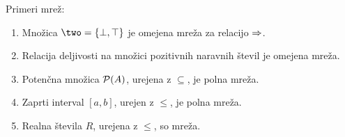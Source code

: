 \begin{primer}
  Primeri mrež:
  \begin{enumerate}
  \item Množica $\two = \set{\bot, \top}$ je omejena mreža za relacijo $\Rightarrow$.
  \item Relacija deljivosti na množici pozitivnih naravnih števil je omejena mreža.
  \item Potenčna množica $\mathcal{P}(A)$, urejena z $\subseteq$, je polna mreža.
  \item Zaprti interval $[a,b]$, urejen z $\leq$, je polna mreža.
  \item Realna števila $R$, urejena z $\leq$, so mreža.
  \end{enumerate}
\end{primer}
